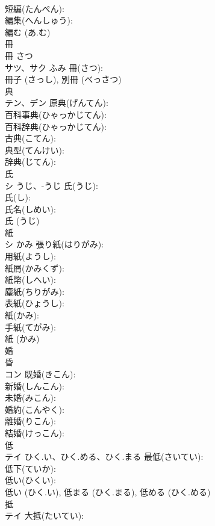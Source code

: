 \documentclass[8pt]{extreport}
\begin{document}
\begin{CJK}{UTF8}{min}
\\	短編(たんぺん): 
\\	編集(へんしゅう): 
\\	編む (あ.む)
\\	冊			
\\	冊 さつ 
\\	サツ、サク	ふみ	冊(さつ): 
\\	冊子 (さっし), 別冊 (べっさつ)
\\	典			
\\	テン、デン		原典(げんてん): 
\\	百科事典(ひゃっかじてん): 
\\	百科辞典(ひゃっかじてん): 
\\	古典(こてん): 
\\	典型(てんけい): 
\\	辞典(じてん): 
\\	氏			
\\	シ	うじ、-うじ	氏(うじ): 
\\	氏(し): 
\\	氏名(しめい): 
\\	氏 (うじ)
\\	紙			
\\	シ	かみ	張り紙(はりがみ): 
\\	用紙(ようし): 
\\	紙屑(かみくず): 
\\	紙幣(しへい): 
\\	塵紙(ちりがみ): 
\\	表紙(ひょうし): 
\\	紙(かみ): 
\\	手紙(てがみ): 
\\	紙 (かみ)
\\	婚			
\\	昏 
\\	コン		既婚(きこん): 
\\	新婚(しんこん): 
\\	未婚(みこん): 
\\	婚約(こんやく): 
\\	離婚(りこん): 
\\	結婚(けっこん): 
\\	低			
\\	テイ	ひく.い、ひく.める、ひく.まる	最低(さいてい): 
\\	低下(ていか): 
\\	低い(ひくい): 
\\	低い (ひく.い), 低まる (ひく.まる), 低める (ひく.める)
\\	抵			
\\	テイ		大抵(たいてい): 

\end{CJK}
\end{document}
